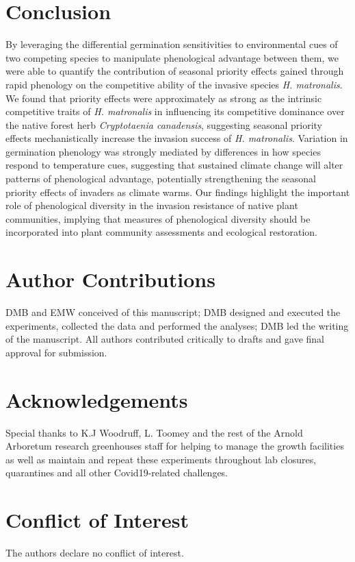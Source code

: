 \documentclass{article}[11pt]
\begin{document}
\section*{Conclusion}
By leveraging the differential germination sensitivities to environmental cues of two competing species to manipulate phenological advantage between them, we were able to quantify the contribution of seasonal priority effects gained through rapid phenology on the competitive ability of the invasive species \textit{H. matronalis}. We found that priority effects were approximately as strong as the intrinsic competitive traits of \textit{H. matronalis} in influencing its competitive dominance over the native forest herb \textit{Cryptotaenia canadensis}, suggesting seasonal priority effects mechanistically increase the invasion success of \textit{H. matronalis}. Variation in germination phenology was strongly mediated by differences in how species respond to temperature cues, suggesting that sustained climate change will alter patterns of phenological advantage, potentially strengthening the seasonal priority effects of invaders as climate warms. Our findings highlight the important role of phenological diversity in the invasion resistance of native plant communities, implying that measures of phenological diversity should be incorporated into plant community assessments and ecological restoration. 

\section*{Author Contributions}
DMB and EMW conceived of this manuscript; DMB designed and executed the experiments, collected the data and performed the analyses; DMB led the writing of the manuscript. All authors contributed critically to drafts and gave final approval for submission.

\section*{Acknowledgements}
Special thanks to K.J Woodruff, L. Toomey and the rest of the Arnold Arboretum research greenhouses staff for helping to manage the growth facilities as well as maintain and repeat these experiments throughout lab closures, quarantines and all other Covid19-related challenges.

\section*{Conflict of Interest}
The authors declare no conflict of interest.
\end{document}
